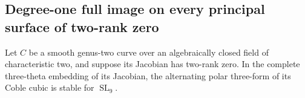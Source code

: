\subsection{Degree-one full image on every principal surface of two-rank zero}

\begin{lemma}
\label{lem:p-rank-zero-genus-two-polar-stable-candidate}
Let $C$ be a smooth genus-two curve over an algebraically closed field
of characteristic two, and suppose its Jacobian has two-rank zero.
In the complete three-theta embedding of its Jacobian, the alternating
polar three-form of its Coble cubic is stable for $\operatorname{SL}_9$.
\end{lemma}
